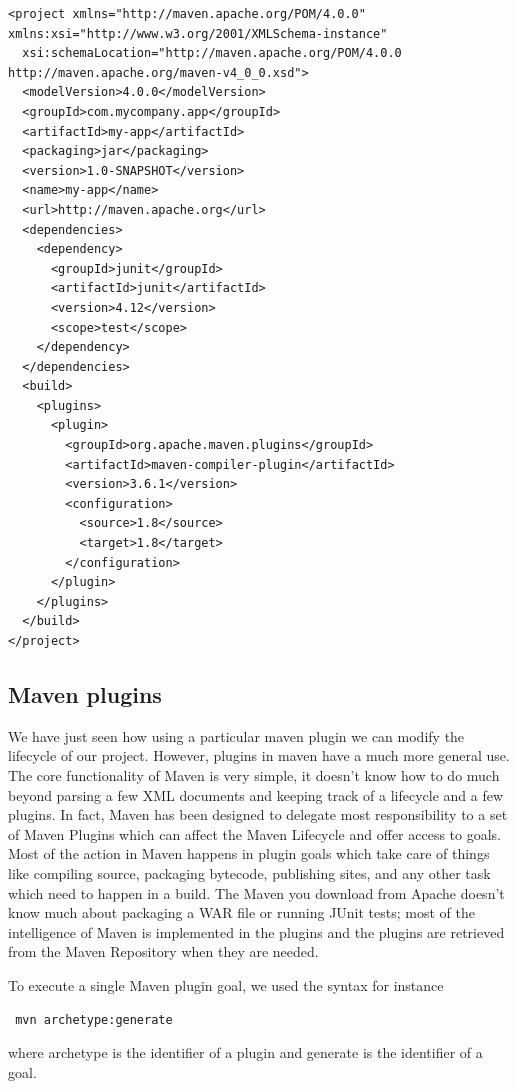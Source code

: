 \documentclass{article}
\begin{document}
\begin{lstlisting}
<project xmlns="http://maven.apache.org/POM/4.0.0" xmlns:xsi="http://www.w3.org/2001/XMLSchema-instance"
  xsi:schemaLocation="http://maven.apache.org/POM/4.0.0 http://maven.apache.org/maven-v4_0_0.xsd">
  <modelVersion>4.0.0</modelVersion>
  <groupId>com.mycompany.app</groupId>
  <artifactId>my-app</artifactId>
  <packaging>jar</packaging>
  <version>1.0-SNAPSHOT</version>
  <name>my-app</name>
  <url>http://maven.apache.org</url>
  <dependencies>
    <dependency>
      <groupId>junit</groupId>
      <artifactId>junit</artifactId>
      <version>4.12</version>
      <scope>test</scope>
    </dependency>
  </dependencies>
  <build>
    <plugins>
      <plugin>
        <groupId>org.apache.maven.plugins</groupId>
        <artifactId>maven-compiler-plugin</artifactId>
        <version>3.6.1</version>
        <configuration>
          <source>1.8</source>
          <target>1.8</target>
        </configuration>
      </plugin>
    </plugins>
  </build>
</project>
\end{lstlisting}



\subsection{Maven plugins}

We have just seen how using a particular maven plugin we can modify
the lifecycle of our project. However, plugins in maven have a much
more general use. 
The core functionality of Maven is very simple, it doesn’t know how to
do much beyond parsing a few XML documents and keeping track of a
lifecycle and a few plugins. In fact, Maven has been designed to
delegate most responsibility to a set of Maven Plugins which can
affect the Maven Lifecycle and offer access to goals. Most of the
action in Maven happens in plugin goals which take care of things like
compiling source, packaging bytecode, publishing sites, and any other
task which need to happen in a build. The Maven you download from
Apache doesn’t know much about packaging a WAR file or running JUnit
tests; most of the intelligence of Maven is implemented in the plugins
and the plugins are retrieved from the Maven Repository when they are
needed.

To execute a single Maven plugin goal, we used the syntax for instance
\begin{lstlisting}
 mvn archetype:generate
\end{lstlisting}
where archetype is the identifier of a plugin and
generate is the identifier of a goal.
\end{document}
